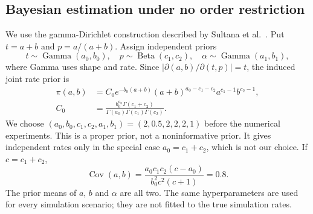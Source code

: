 \documentclass[a4paper,11pt]{article}
\begin{document}
\subsection{Bayesian estimation under no order restriction}\label{sec:unrestricted-bayes}
We use the gamma-Dirichlet construction described by Sultana et al.\ \cite{Sultana2026}. Put $t=a+b$ and $p=a/(a+b)$. Assign independent priors
\begin{equation}
t\sim\operatorname{Gamma}(a_0,b_0),\quad p\sim\operatorname{Beta}(c_1,c_2),\quad \alpha\sim\operatorname{Gamma}(a_1,b_1),\label{eq:prior-components}
\end{equation}
where Gamma uses shape and rate. Since $|\partial(a,b)/\partial(t,p)|=t$, the induced joint rate prior is
\begin{align}
\pi(a,b)&=C_0e^{-b_0(a+b)}(a+b)^{a_0-c_1-c_2}a^{c_1-1}b^{c_2-1},\label{eq:prior}\\
C_0&=\frac{b_0^{a_0}\Gamma(c_1+c_2)}{\Gamma(a_0)\Gamma(c_1)\Gamma(c_2)}.\nonumber
\end{align}
We choose $(a_0,b_0,c_1,c_2,a_1,b_1)=(2,0.5,2,2,2,1)$ before the numerical experiments. This is a proper prior, not a noninformative prior. It gives independent rates only in the special case $a_0=c_1+c_2$, which is not our choice. If $c=c_1+c_2$,
\begin{equation}
\operatorname{Cov}(a,b)=\frac{a_0c_1c_2(c-a_0)}{b_0^2c^2(c+1)}=0.8.\label{eq:prior-cov}
\end{equation}
The prior means of $a$, $b$ and $\alpha$ are all two. The same hyperparameters are used for every simulation scenario; they are not fitted to the true simulation rates.
\end{document}
